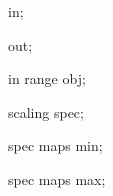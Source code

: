 \newif\ifpgf@dvignore

{%

  \attribute in;%

  \attribute out;%

  \attribute in range obj;%

  \attribute scaling spec;%

  \attribute spec maps min;%

  \attribute spec maps max;%

}
